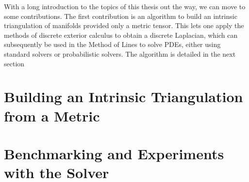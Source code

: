 \newpage*
\newpage
With a long introduction to the topics of this thesis out the way, we can move to some contributions. The first contribution is an algorithm to build an intrinsic triangulation of manifolds provided only a metric tensor. This lets one apply the methods of discrete exterior calculus to obtain a discrete Laplacian, which can subsequently be used in the Method of Lines to solve PDEs, either using standard solvers or probabilistic solvers. The algorithm is detailed in the next section
\section{Building an Intrinsic Triangulation from a Metric}\label{sec:intrinsic_triangulation}


\newpage
\section{Benchmarking and Experiments with the Solver}\label{sec:solver_experiments}


\printbibliography


